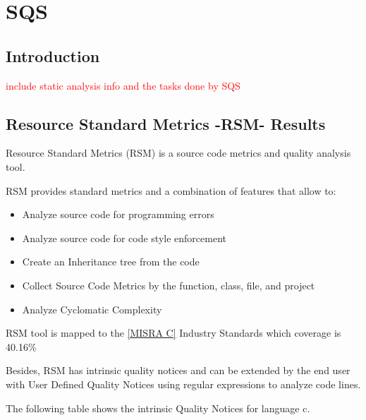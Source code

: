 
\section{SQS}

\subsection{Introduction}
\textcolor{red}{include static analysis info and the tasks done by SQS}


\subsection{Resource Standard Metrics -RSM- Results}

Resource Standard Metrics (RSM) is a source code metrics and quality analysis tool.

RSM provides standard metrics and a combination of features that allow to:
\begin{itemize}
\item Analyze source code for programming errors
\item Analyze source code for code style enforcement
\item Create an Inheritance tree from the code
\item Collect Source Code Metrics by the function, class, file, and project
\item Analyze Cyclomatic Complexity
\end{itemize}

RSM tool is mapped to the \href{http://msquaredtechnologies.com/m2rsm/docs/QualityStandards/MISRA_C_Mapping.htm}{[MISRA C]} Industry Standards which coverage is 40.16\% 


Besides, RSM has intrinsic quality notices and can be extended by the end user with User Defined Quality Notices using regular expressions to analyze code lines. 

The following table shows the intrinsic Quality Notices for language c.

